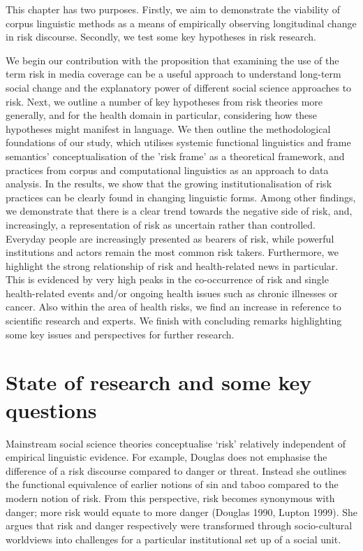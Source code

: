 This chapter has two purposes. Firstly, we aim to demonstrate the viability of corpus linguistic methods as a means of empirically observing longitudinal change in risk discourse. Secondly, we test some key hypotheses in risk research. 

We begin our contribution with the proposition that examining the use of the term risk in media coverage can be a useful approach to understand long-term social change and the explanatory power of different social science approaches to risk. Next, we outline a number of key hypotheses from risk theories more generally, and for the health domain in particular, considering how these hypotheses might manifest in language. We then outline the methodological foundations of our study, which utilises systemic functional linguistics and frame semantics' conceptualisation of the 'risk frame' as a theoretical framework, and practices from corpus and computational linguistics as an approach to data analysis. In the results, we show that the growing institutionalisation of risk practices can be clearly found in changing linguistic forms. Among other findings, we demonstrate that there is a clear trend towards the negative side of risk, and, increasingly, a representation of risk as uncertain rather than controlled. Everyday people are increasingly presented as bearers of risk, while powerful institutions and actors remain the most common risk takers. Furthermore, we highlight the strong relationship of risk and health-related news in particular. This is evidenced by very high peaks in the co-occurrence of risk and single health-related events and\slash or ongoing health issues such as chronic illnesses or cancer. Also within the area of health risks, we find an increase in reference to scientific research and experts. We finish with concluding remarks highlighting some key issues and perspectives for further research.

\section{State of research and some key questions}

Mainstream social science theories conceptualise `risk' relatively independent of empirical linguistic evidence. For example, Douglas does not emphasise the difference of a risk discourse compared to danger or threat. Instead she outlines the functional equivalence of earlier notions of sin and taboo compared to the modern notion of risk. From this perspective, risk becomes synonymous with danger; more risk would equate to more danger (Douglas 1990, Lupton 1999). She argues that risk and danger respectively were transformed through socio-cultural worldviews into challenges for a particular institutional set up of a social unit. 

